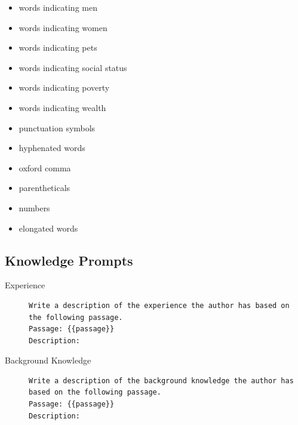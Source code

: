\begin{multicols}{2}
\begin{itemize}[nolistsep]
    \item words indicating men
    \item words indicating women
    \item words indicating pets
    \item words indicating social status
    \item words indicating poverty
    \item words indicating wealth
    \item punctuation symbols
    \item hyphenated words
    \item oxford comma
    \item parentheticals
    \item numbers
    \item elongated words
  \end{itemize}
\end{multicols}

\subsection{Knowledge Prompts}
\label{sec:appendix:knowledgePrompts}
\begin{description}
  \item[Experience]\leavevmode \newline
        \begin{minipage}{\linewidth}
          \begin{lstlisting}
Write a description of the experience the author has based on the following passage.
Passage: {{passage}}
Description:
\end{lstlisting}
        \end{minipage}
  \item[Background Knowledge]\leavevmode \newline
        \begin{minipage}{\linewidth}
          \begin{lstlisting}
Write a description of the background knowledge the author has based on the following passage.
Passage: {{passage}}
Description:
\end{lstlisting}
        \end{minipage}
\end{description}


